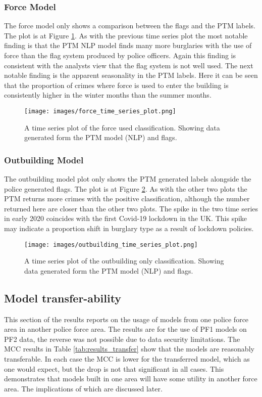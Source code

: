 \subsubsection{Force Model}The force model only shows a comparison between the flags and the PTM labels. The plot is at Figure \ref{fig:force_ts}. As with the previous time series plot the most notable finding is that the PTM NLP model finds many more burglaries with the use of force than the flag system produced by police officers. Again this finding is consistent with the analysts view that the flag system is not well used. The next notable finding is the apparent seasonality in the PTM labels. Here it can be seen that the proportion of crimes where force is used to enter the building is consistently higher in the winter months than the summer months.   


\begin{figure}
  \texttt{[image: images/force\_time\_series\_plot.png]}
  \caption[Force used model time series plot]{A time series plot of the force used classification. Showing data generated form the PTM model (NLP) and flags. }
  \label{fig:force_ts}
\end{figure}


\subsubsection{Outbuilding Model} The outbuilding model plot only shows the PTM generated labels alongside the police generated flags. The plot is at Figure \ref{fig:outbuild_ts}. As with the other two plots the PTM returns more crimes with the positive classification, although the number returned here are closer than the other two plots. The spike in the two time series in early 2020 coincides with the first Covid-19 lockdown in the UK. This spike may indicate a proportion shift in burglary type as a result of lockdown policies.


\begin{figure}
  \texttt{[image: images/outbuilding\_time\_series\_plot.png]}
  \caption[Outbuilding only model time series plot]{A time series plot of the outbuilding only classification. Showing data generated form the PTM model (NLP) and flags. }
  \label{fig:outbuild_ts}
\end{figure}

\subsection{Model transfer-ability} This section of the results reports on the usage of models from one police force area in another police force area. The results are for  the use of PF1 models on PF2 data, the reverse was not possible due to data security limitations. The MCC results in Table \ref{tab:results_transfer} show that the models are reasonably transferable. In each case the MCC is lower for the transferred model, which as one would expect, but the drop is not that significant in all cases. This demonstrates that models built in one area will have some utility in another force area. The implications of which are discussed later.  


